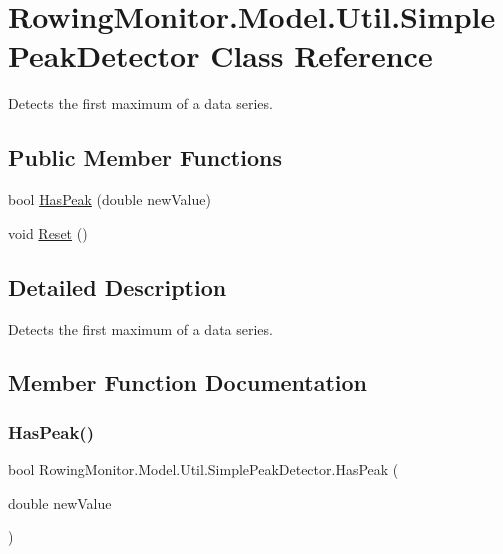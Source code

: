 \hypertarget{class_rowing_monitor_1_1_model_1_1_util_1_1_simple_peak_detector}{}\section{Rowing\+Monitor.\+Model.\+Util.\+Simple\+Peak\+Detector Class Reference}
\label{class_rowing_monitor_1_1_model_1_1_util_1_1_simple_peak_detector}


Detects the first maximum of a data series.  


\subsection*{Public Member Functions}
\begin{DoxyCompactItemize}
\item 
bool \hyperlink{class_rowing_monitor_1_1_model_1_1_util_1_1_simple_peak_detector_afbfd23663a323bf0efa3c99797549067}{Has\+Peak} (double new\+Value)
\item 
void \hyperlink{class_rowing_monitor_1_1_model_1_1_util_1_1_simple_peak_detector_a1205317942814083c99bbe88b8215676}{Reset} ()
\end{DoxyCompactItemize}


\subsection{Detailed Description}
Detects the first maximum of a data series. 



\subsection{Member Function Documentation}
\mbox{\label{class_rowing_monitor_1_1_model_1_1_util_1_1_simple_peak_detector_afbfd23663a323bf0efa3c99797549067}} 
\subsubsection{\texorpdfstring{Has\+Peak()}{HasPeak()}}
{\footnotesize\ttfamily bool Rowing\+Monitor.\+Model.\+Util.\+Simple\+Peak\+Detector.\+Has\+Peak (\begin{DoxyParamCaption}\item[{double}]{new\+Value }\end{DoxyParamCaption})}

